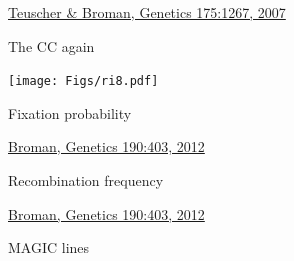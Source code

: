 \documentclass[12pt]{article}
\newcommand{\citesize}{\fontsize{14}{18} \selectfont}
\newcommand{\headsize}{\fontsize{35}{35} \selectfont}
\begin{document}
\vfill

\hfill {\citesize \color{citecolor} \href{http://www.genetics.org/content/175/3/1267.full}{Teuscher \& Broman, Genetics
175:1267, 2007}}

\vspace*{5mm}

\newpage


\headsize \color{myyellow}
\hfill \begin{minipage}{5.75in}
\centering
The CC again
\end{minipage}

\vfill

\centerline{\texttt{[image: Figs/ri8.pdf]}}


\newpage


\headsize \color{myyellow}
\hfill \begin{minipage}{5.75in}
\centering
Fixation probability
\end{minipage}

\vfill

\hfill {\citesize \color{citecolor} \href{http://www.genetics.org/content/190/2/403.full}{Broman, Genetics
190:403, 2012}}

\vspace*{5mm}



\newpage


\headsize \color{myyellow}
\hfill \begin{minipage}{5.75in}
\centering
Recombination frequency
\end{minipage}

\vfill

\hfill {\citesize \color{citecolor} \href{http://www.genetics.org/content/190/2/403.full}{Broman, Genetics
190:403, 2012}}

\vspace*{5mm}



\newpage


\headsize \color{myyellow}
\hfill \begin{minipage}{5.75in}
\centering
MAGIC lines
\end{minipage}
\end{document}
